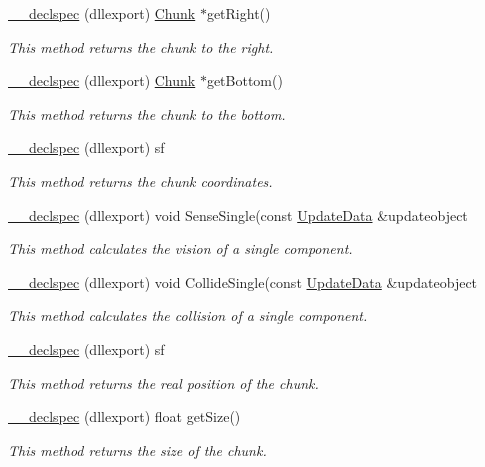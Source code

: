\begin{DoxyCompactItemize}
\hyperlink{class_chunk_a55bd34d914023066cf0bdd1297c3ae8f}{\-\_\-\-\_\-declspec} (dllexport) \hyperlink{class_chunk}{Chunk} $\ast$get\-Right()
\begin{DoxyCompactList}\small\item\em This method returns the chunk to the right. \end{DoxyCompactList}\item 
\hyperlink{class_chunk_a4a65f82eed937ca57e26fbfc8b449fd2}{\-\_\-\-\_\-declspec} (dllexport) \hyperlink{class_chunk}{Chunk} $\ast$get\-Bottom()
\begin{DoxyCompactList}\small\item\em This method returns the chunk to the bottom. \end{DoxyCompactList}\item 
\hyperlink{class_chunk_a11a6eb32b5444ba24bb506e1a57ad4b8}{\-\_\-\-\_\-declspec} (dllexport) sf
\begin{DoxyCompactList}\small\item\em This method returns the chunk coordinates. \end{DoxyCompactList}\item 
\hyperlink{class_chunk_a2a4b74bc2a675752c97407233d14cbaf}{\-\_\-\-\_\-declspec} (dllexport) void Sense\-Single(const \hyperlink{class_update_data}{Update\-Data} \&updateobject
\begin{DoxyCompactList}\small\item\em This method calculates the vision of a single component. \end{DoxyCompactList}\item 
\hyperlink{class_chunk_aabce986183d5f99c1c89a80b51127aa9}{\-\_\-\-\_\-declspec} (dllexport) void Collide\-Single(const \hyperlink{class_update_data}{Update\-Data} \&updateobject
\begin{DoxyCompactList}\small\item\em This method calculates the collision of a single component. \end{DoxyCompactList}\item 
\hyperlink{class_chunk_a11a6eb32b5444ba24bb506e1a57ad4b8}{\-\_\-\-\_\-declspec} (dllexport) sf
\begin{DoxyCompactList}\small\item\em This method returns the real position of the chunk. \end{DoxyCompactList}\item 
\hyperlink{class_chunk_acf3fa4e0c9a7ef9c820c3ba001e449fb}{\-\_\-\-\_\-declspec} (dllexport) float get\-Size()
\begin{DoxyCompactList}\small\item\em This method returns the size of the chunk. \end{DoxyCompactList}\end{DoxyCompactItemize}
